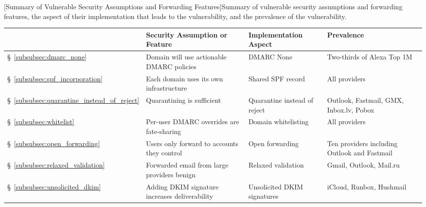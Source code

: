 \begin{table}[t]
  [Summary of Vulnerable Security Assumptions and Forwarding Features]{Summary of vulnerable security assumptions and forwarding features, the aspect of their implementation that leads to the vulnerability, and the prevalence of the vulnerability.
    }
    \centering
    \small
    \begin{tabular}{p{}p{}p{}p{}}
        \toprule
&     \textbf{Security Assumption or Feature} & \textbf{Implementation Aspect}  & \textbf{Prevalence}    \\
    \midrule
    \S~\ref{subsubsec:dmarc_none} &    Domain will use actionable DMARC policies   & DMARC None & Two-thirds of Alexa Top 1M\\
    \S~\ref{subsubsec:spf_incorporation} &  Each domain uses its own infrastructure  & Shared SPF record    & All providers \\
    \S~\ref{subsubsec:quarantine_instead_of_reject}    & Quarantining is sufficient    & Quarantine instead of reject    & Outlook, Fastmail, GMX, Inbox.lv, Pobox \\
    \S~\ref{subsubsec:whitelist}    & Per-user DMARC overrides are fate-sharing    & Domain whitelisting    & All providers  \\ [0.15in]

    \S~\ref{subsubsec:open_forwarding}    & Users only forward to accounts they control   & Open forwarding    & Ten providers including Outlook and Fastmail\\
    \S~\ref{subsubsec:relaxed_validation}    & Forwarded email from large providers benign  & Relaxed validation & Gmail, Outlook, Mail.ru   \\
    \S~\ref{subsubsec:unsolicited_dkim}    & Adding DKIM signature increases deliverability & Unsolicited DKIM signatures & iCloud, Runbox,  Hushmail\\


    \bottomrule
    \end{tabular}
    
    \label{tab:assumptions_and_prevalence}
    \end{table}

